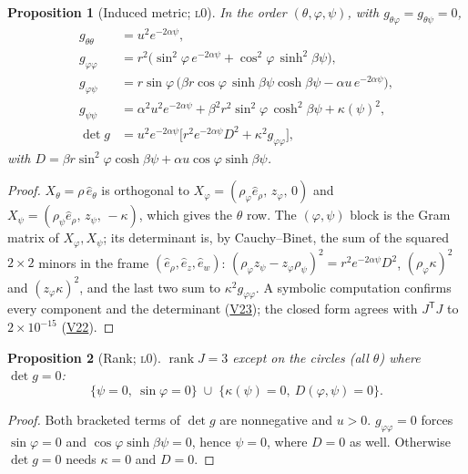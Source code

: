 \documentclass[11pt]{article}
\newtheorem{proposition}{Proposition}
\theoremstyle{definition}
\theoremstyle{remark}
\newcommand{\rank}{\operatorname{rank}}
\newcommand{\lvl}[1]{\textsc{l}#1}
\newcommand{\V}[1]{\hyperref[app:verify]{\textsf{#1}}}
\begin{document}
\begin{proposition}[Induced metric; \lvl{0}]\label{prop:irt-metric}
In the order $(\theta,\varphi,\psi)$, with $g_{\theta\varphi}=g_{\theta\psi}=0$,
\begin{align*}
g_{\theta\theta}&=u^2e^{-2\alpha\psi},\\
g_{\varphi\varphi}&=r^2\bigl(\sin^2\!\varphi\,e^{-2\alpha\psi}+\cos^2\!\varphi\,\sinh^2\!\beta\psi\bigr),\\
g_{\varphi\psi}&=r\sin\varphi\,\bigl(\beta r\cos\varphi\,\sinh\beta\psi\cosh\beta\psi-\alpha u\,e^{-2\alpha\psi}\bigr),\\
g_{\psi\psi}&=\alpha^2u^2e^{-2\alpha\psi}+\beta^2r^2\sin^2\!\varphi\,\cosh^2\!\beta\psi+\kappa(\psi)^2,\\
\det g&=u^2e^{-2\alpha\psi}\bigl[r^2e^{-2\alpha\psi}D^2+\kappa^2g_{\varphi\varphi}\bigr],
\end{align*}
with $D=\beta r\sin^2\!\varphi\cosh\beta\psi+\alpha u\cos\varphi\sinh\beta\psi$.
\end{proposition}
\begin{proof}
$X_\theta=\rho\,\hat e_\theta$ is orthogonal to $X_\varphi=(\rho_\varphi\hat e_\rho,\,z_\varphi,\,0)$ and $X_\psi=(\rho_\psi\hat e_\rho,\,z_\psi,\,-\kappa)$, which gives the $\theta$ row. The $(\varphi,\psi)$ block is the Gram matrix of $X_\varphi,X_\psi$; its determinant is, by Cauchy--Binet, the sum of the squared $2\times2$ minors in the frame $(\hat e_\rho,\hat e_z,\hat e_w)$: $(\rho_\varphi z_\psi-z_\varphi\rho_\psi)^2=r^2e^{-2\alpha\psi}D^2$, $(\rho_\varphi\kappa)^2$ and $(z_\varphi\kappa)^2$, and the last two sum to $\kappa^2g_{\varphi\varphi}$. A symbolic computation confirms every component and the determinant (\V{V23}); the closed form agrees with $J^{\mathsf T}J$ to $2\times10^{-15}$ (\V{V22}).
\end{proof}

\begin{proposition}[Rank; \lvl{0}]\label{prop:irt-rank}
$\rank J=3$ except on the circles (all $\theta$) where $\det g=0$:
\[
\{\psi=0,\ \sin\varphi=0\}\;\cup\;\{\kappa(\psi)=0,\ D(\varphi,\psi)=0\}.
\]
\end{proposition}
\begin{proof}
Both bracketed terms of $\det g$ are nonnegative and $u>0$. $g_{\varphi\varphi}=0$ forces $\sin\varphi=0$ and $\cos\varphi\sinh\beta\psi=0$, hence $\psi=0$, where $D=0$ as well. Otherwise $\det g=0$ needs $\kappa=0$ and $D=0$.
\end{proof}
\end{document}
